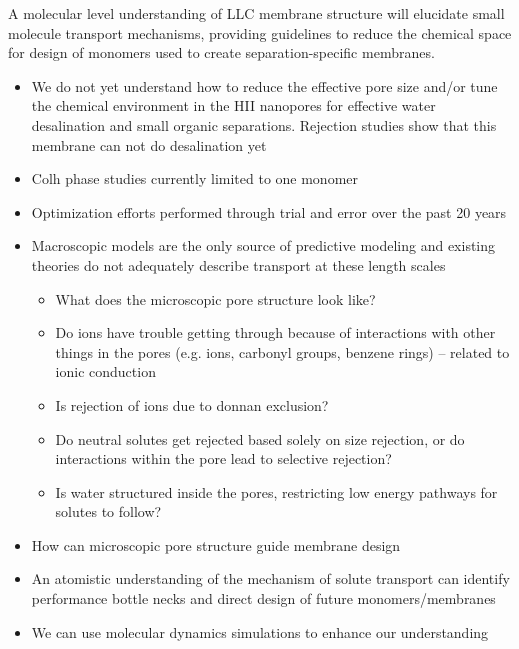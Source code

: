 \documentclass{article}
\begin{document}
	A molecular level understanding of LLC membrane structure will elucidate small molecule transport mechanisms, providing guidelines to reduce the chemical space for design of monomers used to create separation-specific membranes.
	\begin{itemize}
                \item We do not yet understand how to reduce the effective pore size and/or tune the chemical environment in the HII nanopores for effective water desalination and small organic separations. Rejection studies show that this membrane can not do desalination yet
		\item Colh phase studies currently limited to one monomer
                \item Optimization efforts performed through trial and error over the past 20 years
                \item Macroscopic models are the only source of predictive modeling and existing theories do not adequately describe transport at these length scales
                \begin{itemize}
                        \item What does the microscopic pore structure look like?
			\item Do ions have trouble getting through because of interactions with other things in the pores (e.g. ions, carbonyl groups, benzene rings) -- related to ionic conduction
			\item Is rejection of ions due to donnan exclusion?
                        \item Do neutral solutes get rejected based solely on size rejection, or do interactions within the pore lead to selective rejection?
                        \item Is water structured inside the pores, restricting low energy pathways for solutes to follow? %
		\end{itemize}
		\item How can microscopic pore structure guide membrane design
		\item An atomistic understanding of the mechanism of solute transport can identify performance bottle necks and direct design of future monomers/membranes
		\item We can use molecular dynamics simulations to enhance our understanding 
	\end{itemize}
	 
\end{document}
